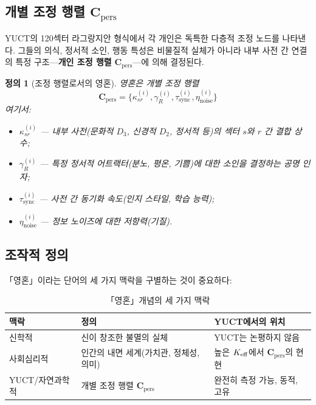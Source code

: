 \documentclass[11pt,a4paper]{article}
\newtheorem{definition}{정의}[section]
\newcommand{\Cpers}{\mathbf{C}_{\text{pers}}}
\begin{document}
	\subsection{개별 조정 행렬 \(\Cpers\)}
	
	YUCT의 120섹터 라그랑지안 형식에서 각 개인은 독특한 다층적 조정 노드를 나타낸다. 그들의 의식, 정서적 소인, 행동 특성은 비물질적 실체가 아니라 내부 사전 간 연결의 특정 구조—\textbf{개인 조정 행렬} \(\Cpers\)—에 의해 결정된다.
	
	\begin{definition}[조정 행렬로서의 영혼]
		영혼은 개별 조정 행렬
		\[
		\Cpers = \{\kappa_{sr}^{(i)}, \gamma_R^{(i)}, \tau_{\text{sync}}^{(i)}, \eta_{\text{noise}}^{(i)}\}
		\]
		여기서:
		\begin{itemize}
			\item \(\kappa_{sr}^{(i)}\) — 내부 사전(문화적 \(D_3\), 신경적 \(D_2\), 정서적 등)의 섹터 \(s\)와 \(r\) 간 결합 상수;
			\item \(\gamma_R^{(i)}\) — 특정 정서적 어트랙터(분노, 평온, 기쁨)에 대한 소인을 결정하는 공명 인자;
			\item \(\tau_{\text{sync}}^{(i)}\) — 사전 간 동기화 속도(인지 스타일, 학습 능력);
			\item \(\eta_{\text{noise}}^{(i)}\) — 정보 노이즈에 대한 저항력(기질).
		\end{itemize}
	\end{definition}
	
	\subsection{조작적 정의}
	
	「영혼」이라는 단어의 세 가지 맥락을 구별하는 것이 중요하다:
	
	\begin{table}[H]
		\centering
		\caption{「영혼」개념의 세 가지 맥락}
		\label{tab:soul-contexts}
		\begin{tabular}{p{3.5cm}p{5cm}p{5cm}}
			\toprule
			\textbf{맥락} & \textbf{정의} & \textbf{YUCT에서의 위치} \\
			\midrule
			신학적 & 신이 창조한 불멸의 실체 & YUCT는 논평하지 않음 \\
			사회심리적 & 인간의 내면 세계(가치관, 정체성, 의미) & 높은 \(\Keff\)에서 \(\Cpers\)의 현현 \\
			YUCT/자연과학적 & 개별 조정 행렬 \(\Cpers\) & 완전히 측정 가능, 동적, 고유 \\
			\bottomrule
		\end{tabular}
	\end{table}
	
\end{document}
